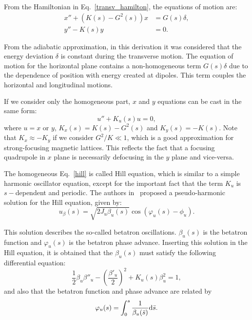 From the Hamiltonian in Eq.~\eqref{transv_hamilton}, the equations of motion are:
\begin{align}
    x'' + \left(K(s) - G^{2}(s)\right)x &= G(s) \delta, \label{eq:motion_x} \\
    y'' - K(s)y &= 0.
\end{align}

From the adiabatic approximation, in this derivation it was considered that the energy deviation $\delta$ is constant during the transverse motion. The equation of motion for the horizontal plane contains a non-homogeneous term $G(s)\delta$ due to the dependence of position with energy created at dipoles. This term couples the horizontal and longitudinal motions.

If we consider only the homogeneous part, $x$ and $y$ equations can be cast in the same form:
\begin{equation}
u'' + K_u(s) u = 0,
\label{hill}
\end{equation}
where $u = x$ or $y$, $K_x(s) = K(s) - G^2(s)$ and $K_y(s) = -K(s)$. Note that $K_x \approx -K_y$ if we consider $G^2/K \ll 1$, which is a good approximation for strong-focusing magnetic lattices. This reflects the fact that a focusing quadrupole in $x$ plane is necessarily defocusing in the $y$ plane and vice-versa. 

The homogeneous Eq.~\eqref{hill} is called Hill equation, which is similar to a simple harmonic oscillator equation, except for the important fact that the term $K_u$ is $s-$dependent and periodic. The authors in~\cite{CourantSnyder1958} proposed a pseudo-harmonic solution for the Hill equation, given by:
\begin{equation}
    u_{\beta}(s) = \sqrt{2 J_u \beta_u (s)} \cos \left(\varphi_u(s) - \phi_u\right).
    \label{eq:beta_oscillation}
\end{equation}

This solution describes the so-called betatron oscillations. $\beta_u(s)$ is the betatron function and $\varphi_u(s)$ is the betatron phase advance. Inserting this solution in the Hill equation, it is obtained that the $\beta_u(s)$ must satisfy the following differential equation:
\begin{equation}
    \dfrac{1}{2}\beta_u {\beta''_u} -  \left(\dfrac{\beta'_u}{2}\right)^2 + K_u(s) \beta^2_u = 1,
    \label{beta_equation}
\end{equation}
and also that the betatron function and phase advance are related by
\begin{equation}
\varphi_u(s) = \int_{0}^{s} \dfrac{1}{\beta_u(\bar{s})} \mathrm{d} \bar{s}.
\end{equation}

